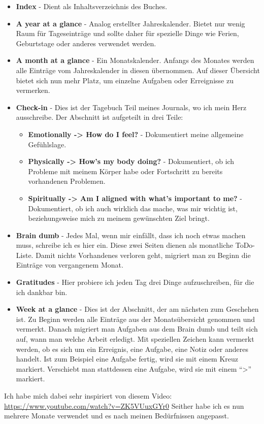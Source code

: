 \begin{itemize}
  \item \textbf{Index} - Dient als Inhaltsverzeichnis des Buches.
  \item \textbf{A year at a glance} - Analog erstellter Jahreskalender. Bietet nur wenig Raum für Tageseinträge und sollte daher für spezielle Dinge wie Ferien, Geburtstage oder anderes verwendet werden.
  \item \textbf{A month at a glance} - Ein Monatskalender. Anfangs des Monates werden alle Einträge vom Jahreskalender in diesen übernommen. Auf dieser Übersicht bietet sich nun mehr Platz, um einzelne Aufgaben oder Erreignisse zu vermerken.
  \item \textbf{Check-in} - Dies ist der Tagebuch Teil meines Journals, wo ich mein Herz ausschreibe. Der Abschnitt ist aufgeteilt in drei Teile:
  \begin{itemize}
    \item \textbf{Emotionally -> How do I feel?} - Dokumentiert meine allgemeine Gefühlslage.
    \item \textbf{Physically -> How's my body doing?} - Dokumentiert, ob ich Probleme mit meinem Körper habe oder Fortschritt zu bereits vorhandenen Problemen.
    \item \textbf{Spiritually -> Am I aligned with what's important to me?} - Dokumentiert, ob ich auch wirklich das mache, was mir wichtig ist, beziehungsweise mich zu meinem gewünschten Ziel bringt.
  \end{itemize}
  \item \textbf{Brain dumb} - Jedes Mal, wenn mir einfällt, dass ich noch etwas machen muss, schreibe ich es hier ein. Diese zwei Seiten dienen als monatliche ToDo-Liste. Damit nichts Vorhandenes verloren geht, migriert man zu Beginn die Einträge von vergangenem Monat.
  \item \textbf{Gratitudes} - Hier probiere ich jeden Tag drei Dinge aufzuschreiben, für die ich dankbar bin.
  \item \textbf{Week at a glance} - Dies ist der Abschnitt, der am nächsten zum Geschehen ist. Zu Beginn werden alle Einträge aus der Monatsübersicht genommen und vermerkt. Danach migriert man Aufgaben aus dem Brain dumb und teilt sich auf, wann man welche Arbeit erledigt. Mit speziellen Zeichen kann vermerkt werden, ob es sich um ein Erreignis, eine Aufgabe, eine Notiz oder anderes handelt. Ist zum Beispiel eine Aufgabe fertig, wird sie mit einem Kreuz markiert. Verschiebt man stattdessen eine Aufgabe, wird sie mit einem “>” markiert.
\end{itemize}
Ich habe mich dabei sehr inspiriert von diesem Video:
\newline
\url{https://www.youtube.com/watch?v=ZK5VUuxGYr0}
\newline
Seither habe ich es nun mehrere Monate verwendet und es nach meinen Bedürfnissen angepasst.

